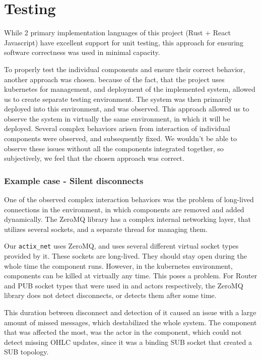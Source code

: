 \section{Testing}
While 2 primary implementation languages of this project (Rust + React Javascript) have excellent support for unit testing,
this approach for ensuring software correctness was used in minimal capacity.

To properly test the individual components and ensure their correct behavior, another approach was chosen. because of the
fact, that the project uses kubernetes for management, and deployment of the implemented system, allowed us to create
separate testing environment. The system was then primarily deployed into this environment, and was observed.
This approach allowed us to observe the system in virtually the same environment, in which it will be deployed.
Several complex behaviors arisen from interaction of individual components were observed, and subsequently fixed.
We wouldn't be able to observe these issues without all the components integrated together, so subjectively, we
feel that the chosen approach was correct.

\subsubsection{Example case - Silent disconnects}
One of the observed complex interaction behaviors was the problem of long-lived connections in the environment, in
which components are removed and added dynamically.
The ZeroMQ library has a complex internal networking layer, that utilizes several sockets, and a separate thread
for managing them.

Our \verb|actix_net| uses ZeroMQ, and uses several different virtual socket types provided by it. These sockets
are long-lived. They should stay open during the whole time the component runs. However, in the kubernetes environment,
components can be killed at virtually any time. This poses a problem. For Router and PUB socket types that were
used in  and  actors respectively, the ZeroMQ library does not detect disconnects, or detects
them after some time.

This duration between disconnect and detection of it caused an issue with a large amount of missed messages, which
destabilized the whole system. The component that was affected the most, was the  actor in the 
component, which could not detect missing OHLC updates, since it was a binding SUB socket that created a SUB topology.

